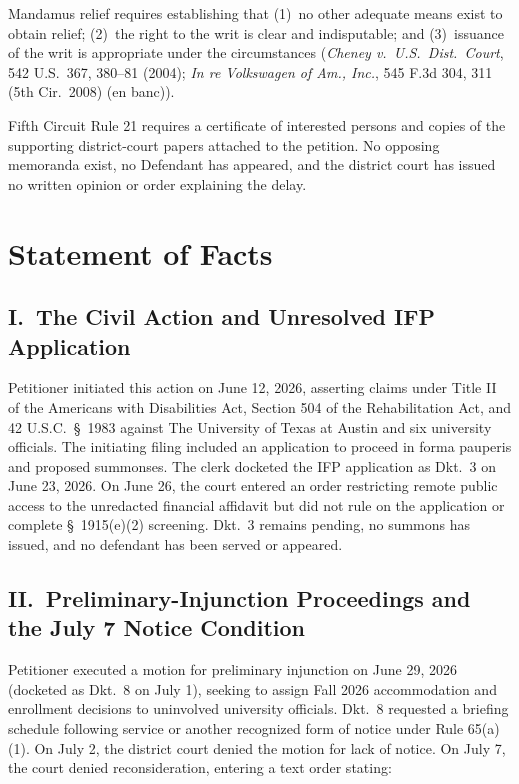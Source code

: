 \documentclass[14pt]{extarticle}
\begin{document}
Mandamus relief requires establishing that (1)~no other adequate means exist to obtain relief; (2)~the right to the writ is clear and indisputable; and (3)~issuance of the writ is appropriate under the circumstances (\textit{Cheney v.\ U.S.\ Dist.\ Court}, 542 U.S.\ 367, 380--81 (2004); \textit{In re Volkswagen of Am., Inc.}, 545 F.3d 304, 311 (5th Cir.\ 2008) (en banc)).

Fifth Circuit Rule 21 requires a certificate of interested persons and copies of the supporting district-court papers attached to the petition. No opposing memoranda exist, no Defendant has appeared, and the district court has issued no written opinion or order explaining the delay.

\section*{Statement of Facts}

\subsection*{I.\ The Civil Action and Unresolved IFP Application}

Petitioner initiated this action on June 12, 2026, asserting claims under Title II of the Americans with Disabilities Act, Section 504 of the Rehabilitation Act, and 42 U.S.C.\ \S\ 1983 against The University of Texas at Austin and six university officials. The initiating filing included an application to proceed in forma pauperis and proposed summonses. The clerk docketed the IFP application as Dkt.\ 3 on June 23, 2026. On June 26, the court entered an order restricting remote public access to the unredacted financial affidavit but did not rule on the application or complete \S\ 1915(e)(2) screening. Dkt.\ 3 remains pending, no summons has issued, and no defendant has been served or appeared.

\subsection*{II.\ Preliminary-Injunction Proceedings and the July 7 Notice Condition}

Petitioner executed a motion for preliminary injunction on June 29, 2026 (docketed as Dkt.\ 8 on July 1), seeking to assign Fall 2026 accommodation and enrollment decisions to uninvolved university officials. Dkt.\ 8 requested a briefing schedule following service or another recognized form of notice under Rule 65(a)(1). On July 2, the district court denied the motion for lack of notice. On July 7, the court denied reconsideration, entering a text order stating:
\end{document}
